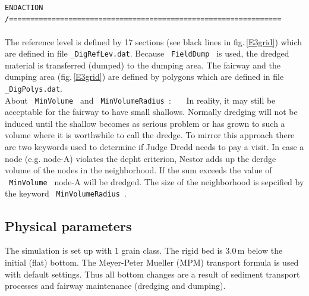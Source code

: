\\ \hspace*{3mm} \texttt{\small{ENDACTION}}
\\ \hspace*{3mm} \texttt{\small{/================================================================}}\\
\\
The reference level is defined by 17 sections (see black lines in fig.\,\ref{E3grid}) which are defined in file \texttt{\_DigRefLev.dat}.
Because \texttt{~FieldDump~} is used, the dredged material is transferred (dumped) to the dumping area.
The fairway and the dumping area (fig.\,\ref{E3grid}) are defined by polygons which are defined in file \texttt{\_DigPolys.dat}.\\
About \texttt{~MinVolume~} and \texttt{~MinVolumeRadius }:~~~
In reality, it may still be acceptable for the fairway to have small shallows.
Normally dredging will not be induced until the shallow becomes as serious problem
or has grown to such a volume where it is worthwhile to call the dredge.
To mirror this approach there are two keywords used to determine if Judge Dredd needs to pay a visit.
In case a node (e.g. node-A) violates the depht criterion, Nestor adds up the derdge volume of the nodes in the neighborhood.
If the sum exceeds the value of \texttt{~MinVolume~} node-A will be dredged.
The size of the neighborhood is sepcified by the keyword \texttt{~MinVolumeRadius~}.
\\

\subsection{Physical parameters}
The simulation is set up with 1 grain class.
The rigid bed is 3.0\,m below the initial (flat) bottom.
The Meyer-Peter Mueller (MPM) transport formula is used with default settings.
Thus all bottom changes are a result of sediment transport processes and fairway maintenance (dredging and dumping).

